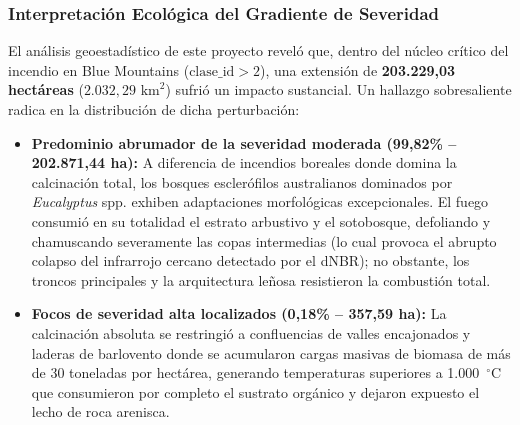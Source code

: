 \documentclass[12pt]{article}
\begin{document}
\subsubsection{Interpretación Ecológica del Gradiente de Severidad}
El análisis geoestadístico de este proyecto reveló que, dentro del núcleo crítico del incendio en Blue Mountains ($\text{clase\_id} > 2$), una extensión de \textbf{203.229,03 hectáreas} ($2.032,29\text{ km}^2$) sufrió un impacto sustancial. Un hallazgo sobresaliente radica en la distribución de dicha perturbación:
\begin{itemize}
    \item \textbf{Predominio abrumador de la severidad moderada (99,82\% -- 202.871,44 ha):} A diferencia de incendios boreales donde domina la calcinación total, los bosques esclerófilos australianos dominados por \textit{Eucalyptus} spp. exhiben adaptaciones morfológicas excepcionales. El fuego consumió en su totalidad el estrato arbustivo y el sotobosque, defoliando y chamuscando severamente las copas intermedias (lo cual provoca el abrupto colapso del infrarrojo cercano detectado por el dNBR); no obstante, los troncos principales y la arquitectura leñosa resistieron la combustión total.
    \item \textbf{Focos de severidad alta localizados (0,18\% -- 357,59 ha):} La calcinación absoluta se restringió a confluencias de valles encajonados y laderas de barlovento donde se acumularon cargas masivas de biomasa de más de 30 toneladas por hectárea, generando temperaturas superiores a 1.000~$^\circ$C que consumieron por completo el sustrato orgánico y dejaron expuesto el lecho de roca arenisca.
\end{itemize}
\end{document}
